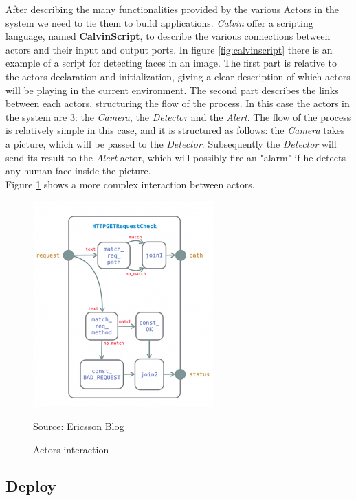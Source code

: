   After describing the many functionalities provided by the various Actors in the system
  we need to tie them to build applications. \textit{Calvin} offer a scripting language,
  named \textbf{CalvinScript}, to describe the various connections between actors
  and their input and output ports. In figure \ref{fig:calvinscript} there is an example
  of a script for detecting faces in an image. The first part is relative to the actors declaration
  and initialization, giving a clear description of which actors will be playing in the current
  environment. The second part describes the links between each actors, structuring the flow
  of the process. In this case the actors in the system are 3: the \textit{Camera}, the \textit{Detector}
  and the \textit{Alert}. The flow of the process is relatively simple in this case, and it is structured
  as follows: the  \textit{Camera} takes a picture, which will be passed to the \textit{Detector}. Subsequently
  the \textit{Detector} will send its result to the \textit{Alert} actor, which will possibly fire an "alarm" if he
  detects any human face inside the picture.\\
  Figure \ref{fig:calvinactors} shows a more complex interaction between actors. %

  \begin{figure}[h]
  \caption{Actors interaction}

  \label{fig:calvinactors}
  \centering
  \includegraphics[scale=0.75]{calvin3.png}
  \par{Source: Ericsson Blog}
  \end{figure}



\subsection{Deploy}

